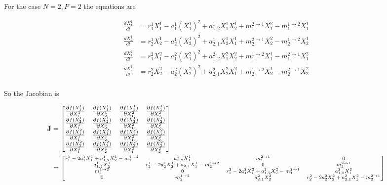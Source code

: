 \documentclass[12pt]{article}
\begin{document}
For the case $N = 2, P=2$ the equations are

\begin{align*}
\frac{dX_1^1}{dt} &=  r_1^1 X_1^1 - a_1^1(X_1^1)^2 +  a_{1,2}^1X_1^1X_2^1 + m_1^{2\rightarrow 1} X_1^2 - m_1^{1\rightarrow 2} X_1^1\\
\frac{dX_2^1}{dt} &=  r_2^1 X_2^1 - a_2^1 (X_2^1)^2 + a_{2,1}^1X_2^1X_1^1  + m_2^{2\rightarrow 1} X_2^2 - m_2^{1\rightarrow 2}X_2^1\\
\frac{dX_1^2}{dt} &=  r_1^2 X_1^2 - a_1^2 (X_1^2)^2 + a_{1,2}^2X_1^2X_2^2 + m_1^{1\rightarrow 2}X_1^1 - m_1^{2\rightarrow 1}X_1^2 \\
\frac{dX_2^2}{dt} &=  r_2^2 X_2^2 - a_2^2 (X_2^2)^2  + a_{2,1}^2X_2^2X_1^2 + m_2^{1\rightarrow 2} X_2^1 - m_2^{2\rightarrow 1} X_2^2\\
\end{align*}

So the Jacobian is 

\begin{align*}
\mathbf{J} &= \begin{bmatrix}
    \frac{\partial f(X_1^1)}{\partial X_1^1} & \frac{\partial f(X_1^1)}{\partial X_2^1} & \frac{\partial f(X_1^1)}{\partial X_1^2} & \frac{\partial f(X_1^1)}{\partial X_2^2}\\ 
        \frac{\partial f(X_2^1)}{\partial X_1^1} & \frac{\partial f(X_2^1)}{\partial X_2^1} & \frac{\partial f(X_2^1)}{\partial X_1^2} & \frac{\partial f(X_2^1)}{\partial X_2^2}\\ 
            \frac{\partial f(X_1^2)}{\partial X_1^1} & \frac{\partial f(X_1^2)}{\partial X_2^1} & \frac{\partial f(X_1^2)}{\partial X_1^2} & \frac{\partial f(X_1^2)}{\partial X_2^2}\\ 
                \frac{\partial f(X_2^2)}{\partial X_1^1} & \frac{\partial f(X_2^2)}{\partial X_2^1} & \frac{\partial f(X_2^2)}{\partial X_1^2} & \frac{\partial f(X_2^2)}{\partial X_2^2} \\    
\end{bmatrix} \\
 &= \scriptsize{\begin{bmatrix}
    r_1^1 - 2a_1^1X_1^1 + a_{1,2}^1X_2^1 - m_1^{1\rightarrow 2} &  a_{1,2}^1 X_1^1 & m_1^{2\rightarrow 1} & 0 \\ 
    a_{1,2}^1X_2^1 & r_2^1 - 2a_2^1X_2^1 + a_{2,1}X_1^1 - m_2^{1\rightarrow 2} & 0 & m_2^{2\rightarrow 1} \\
    m_1^{1\rightarrow 2} & 0 & r_1^2 -2a_1^2X_1^2 + a_{1,2}^2X_2^2  - m_1^{2\rightarrow 1}& a_{1,2}^2X_1^2 \\
    0 & m_2^{1\rightarrow 2} & a_{2,1}^2X_2^2 & r_2^2 - 2a_2^2X_2^2 + a_{2,1}^2X_1^2-m_2^{2\rightarrow 1}\\       
\end{bmatrix} }
\end{align*}
\end{document}
